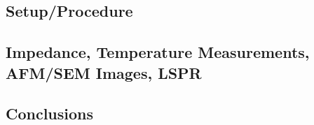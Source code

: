 \documentclass[12pt,oneside,english]{article}
\begin{document}
	\subsection{Setup/Procedure}
	\subsection{Impedance, Temperature Measurements, AFM/SEM Images, LSPR}
	\subsection{Conclusions}




\clearpage


\end{document}
